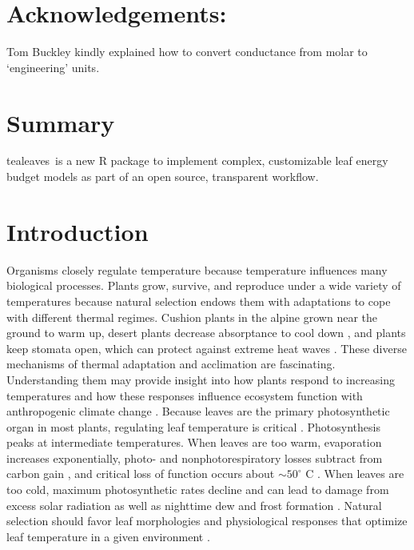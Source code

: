 \documentclass[11pt, oneside]{article}
\newcommand{\pkg}[1]{{\fontseries{b}\selectfont #1}}
\newcommand{\tealeaves}{\pkg{tealeaves}}
\begin{document}
\section*{Acknowledgements:}  

Tom Buckley kindly explained how to convert conductance from molar to `engineering' units.

\clearpage


\onehalfspacing

\section*{Summary}

\tealeaves~is a new R package to implement complex, customizable leaf energy budget models as part of an open source, transparent workflow.

\section*{Introduction}


Organisms closely regulate temperature because temperature influences many biological processes. Plants grow, survive, and reproduce under a wide variety of temperatures because natural selection endows them with adaptations to cope with different thermal regimes. Cushion plants in the alpine grown near the ground to warm up, desert plants decrease absorptance to cool down \citep{Ehleringer_etal_1976}, and plants keep stomata open, which can protect against extreme heat waves \citep{Drake_etal_2018}. These diverse mechanisms of thermal adaptation and acclimation are fascinating. Understanding them may provide insight into how plants respond to increasing temperatures and how these responses influence ecosystem function with anthropogenic climate change \citep{Rogers_etal_2017}. Because leaves are the primary photosynthetic organ in most plants, regulating leaf temperature is critical \citep{Berry_Bjorkman_1980}. Photosynthesis peaks at intermediate temperatures\citep{Sage_Kubien_2007}. When leaves are too warm, evaporation increases exponentially, photo- and nonphotorespiratory losses subtract from carbon gain \citep{Jones_2014}, and critical loss of function occurs about $\sim 50^{\circ}$ C \citep{Osullivan_etal_2017}. When leaves are too cold, maximum photosynthetic rates decline and can lead to damage from excess solar radiation \citep{Huner_etal_1993} as well as nighttime dew and frost formation \citep{Jordan_Smith_1994}. Natural selection should favor leaf morphologies and physiological responses that optimize leaf temperature in a given environment \citep{Parkhurst_Loucks_1972, Okajima_etal_2012, Michaletz_etal_2016}.
\end{document}

